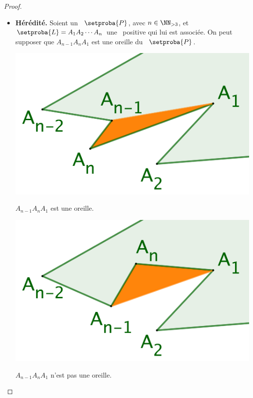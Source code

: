 \begin{proof}
\begin{itemize}
		\item \textbf{Hérédité.} 
		Soient un \ngone\ $\setproba{P}$, avec $n \in \NN_{>3}$, et $\setproba{L} = A_1 A_2 \cdots A_n$ une \nline\ positive qui lui est associée. On peut supposer que $A_{n-1} A_n A_1$ est une oreille du \ngone\ $\setproba{P}$.


	    \begin{multicols}{2}
    	    \small\itshape
    		\begin{center}
        	\includegraphics[scale=.4]{content/polygon/sufficient-cond/triangulation-proof-OK.png}
        
	        	\smallskip
    	   		$A_{n-1} A_n A_1$ est une oreille.
    	\end{center}
	
	    	\begin{center}
        	\includegraphics[scale=.4]{content/polygon/sufficient-cond/triangulation-proof-KO.png}
        
        		\smallskip
    	   		$A_{n-1} A_n A_1$ n'est pas une oreille.
    		\end{center}
    	\end{multicols}
		

\end{itemize}
\end{proof}
